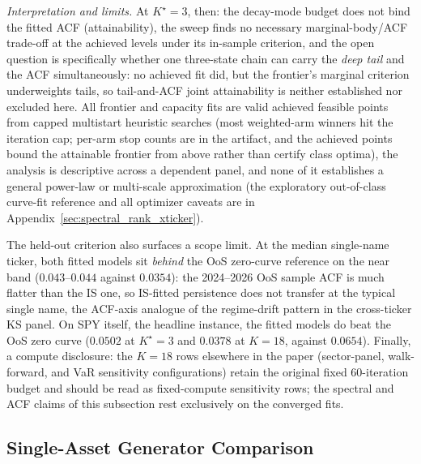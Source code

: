 \emph{Interpretation and limits.} At $K^\star = 3$, then: the decay-mode budget does not bind the fitted ACF (attainability), the sweep finds no necessary marginal-body/ACF trade-off at the achieved levels under its in-sample criterion, and the open question is specifically whether one three-state chain can carry the \emph{deep tail} and the ACF simultaneously: no achieved fit did, but the frontier's marginal criterion underweights tails, so tail-and-ACF joint attainability is neither established nor excluded here. All frontier and capacity fits are valid achieved feasible points from capped multistart heuristic searches (most weighted-arm winners hit the iteration cap; per-arm stop counts are in the artifact, and the achieved points bound the attainable frontier from above rather than certify class optima), the analysis is descriptive across a dependent panel, and none of it establishes a general power-law or multi-scale approximation (the exploratory out-of-class curve-fit reference and all optimizer caveats are in Appendix~\ref{sec:spectral_rank_xticker}).

The held-out criterion also surfaces a scope limit. At the median single-name ticker, both fitted models sit \emph{behind} the OoS zero-curve reference on the near band ($0.043$--$0.044$ against $0.0354$): the 2024--2026 OoS sample ACF is much flatter than the IS one, so IS-fitted persistence does not transfer at the typical single name, the ACF-axis analogue of the regime-drift pattern in the cross-ticker KS panel. On SPY itself, the headline instance, the fitted models do beat the OoS zero curve ($0.0502$ at $K^\star = 3$ and $0.0378$ at $K = 18$, against $0.0654$). Finally, a compute disclosure: the $K = 18$ rows elsewhere in the paper (sector-panel, walk-forward, and VaR sensitivity configurations) retain the original fixed 60-iteration budget and should be read as fixed-compute sensitivity rows; the spectral and ACF claims of this subsection rest exclusively on the converged fits.

\subsection{Single-Asset Generator Comparison}

